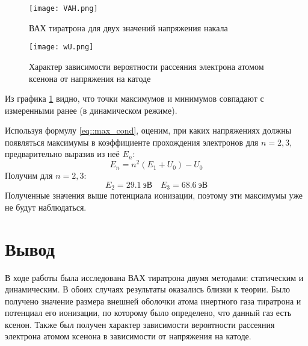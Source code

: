 \begin{figure}[h!]
  \centering
  \texttt{[image: VAH.png]}
  \caption{ВАХ тиратрона для двух значений напряжения накала}
  \label{img::VAH}
\end{figure}
\begin{figure}[h!]
  \centering
  \texttt{[image: wU.png]}
  \caption{Характер зависимости вероятности рассеяния электрона атомом ксенона от напряжения на катоде}
\end{figure}

Из графика \ref{img::VAH} видно, что точки максимумов и минимумов совпадают с
измеренными ранее (в динамическом режиме).

Используя формулу \eqref{eq::max_cond}, оценим, при каких напряжениях должны
появляться максимумы в коэффициенте прохождения электронов для $n = 2, 3$,
предварительно выразив из неё $E_n$:
\[
  E_n = n^2 \left(E_1 + U_0\right) - U_0
\]
Получим для $n = 2, 3$:
\[
  E_2 = 29.1 \: \text{эВ} \quad
  E_3 = 68.6 \: \text{эВ}
\]
Полученные значения выше потенциала ионизации, поэтому эти максимумы уже не
будут наблюдаться.

\section{Вывод}

В ходе работы была исследована ВАХ тиратрона двумя методами: статическим и
динамическим. В обоих случаях результаты оказались близки к теории. Было
получено значение размера внешней оболочки атома инертного газа тиратрона и
потенциал его ионизации, по которому было определено, что данный газ есть
ксенон. Также был получен характер зависимости вероятности рассеяния электрона
атомом ксенона  в зависимости от напряжения на катоде.